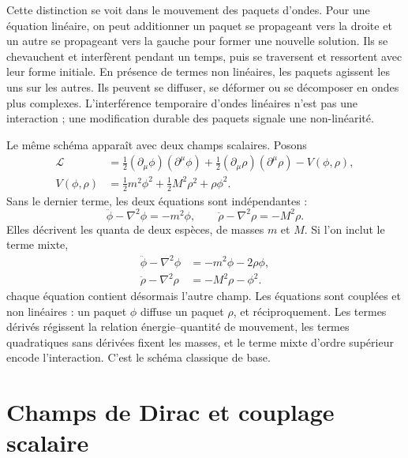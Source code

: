 Cette distinction se voit dans le mouvement des paquets d’ondes. Pour une équation linéaire, on peut additionner un paquet se propageant vers la droite et un autre se propageant vers la gauche pour former une nouvelle solution. Ils se chevauchent et interfèrent pendant un temps, puis se traversent et ressortent avec leur forme initiale. En présence de termes non linéaires, les paquets agissent les uns sur les autres. Ils peuvent se diffuser, se déformer ou se décomposer en ondes plus complexes. L’interférence temporaire d’ondes linéaires n’est pas une interaction ; une modification durable des paquets signale une non-linéarité.

Le même schéma apparaît avec deux champs scalaires. Posons
\begin{align}
\mathcal L
&=
\frac12(\partial_\mu\phi)(\partial^\mu\phi)
+\frac12(\partial_\mu\rho)(\partial^\mu\rho)
-V(\phi,\rho),
\\
V(\phi,\rho)
&=
\frac12m^2\phi^2+\frac12M^2\rho^2+\rho\phi^2.
\end{align}
Sans le dernier terme, les deux équations sont indépendantes :
\begin{equation}
\ddot\phi-\nabla^2\phi=-m^2\phi,
\qquad
\ddot\rho-\nabla^2\rho=-M^2\rho.
\end{equation}
Elles décrivent les quanta de deux espèces, de masses \(m\) et \(M\). Si l’on inclut le terme mixte,
\begin{align}
\ddot\phi-\nabla^2\phi&=-m^2\phi-2\rho\phi,
\\
\ddot\rho-\nabla^2\rho&=-M^2\rho-\phi^2.
\end{align}
chaque équation contient désormais l’autre champ. Les équations sont couplées et non linéaires : un paquet \(\phi\) diffuse un paquet \(\rho\), et réciproquement. Les termes dérivés régissent la relation énergie--quantité de mouvement, les termes quadratiques sans dérivées fixent les masses, et le terme mixte d’ordre supérieur encode l’interaction. C’est le schéma classique de base.

\section{Champs de Dirac et couplage scalaire}

